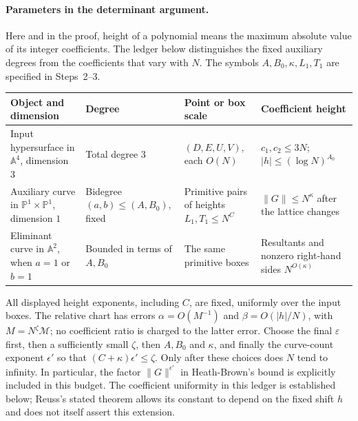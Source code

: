 \paragraph{Parameters in the determinant argument.}
Here and in the proof, height of a polynomial means the maximum absolute
value of its integer coefficients.  The ledger below distinguishes the
fixed auxiliary degrees from the coefficients that vary with $N$.
The symbols $A,B_0,\kappa,L_1,T_1$ are specified in Steps~2--3.
\begin{center}
\small
\begin{tabularx}{\textwidth}{@{}>{\raggedright\arraybackslash}p{}>{\raggedright\arraybackslash}p{}>{\raggedright\arraybackslash}p{}>{\raggedright\arraybackslash}X@{}}
\toprule
Object and dimension & Degree & Point or box scale & Coefficient height\\
\midrule
Input hypersurface in $\mathbb A^4$, dimension $3$
& Total degree $3$
& $(D,E,U,V)$, each $O(N)$
& $c_1,c_2\leq3N$; $|h|\leq(\log N)^{A_0}$\\
Auxiliary curve in $\mathbb P^1\!\times\!\mathbb P^1$, dimension $1$
& Bidegree $(a,b)\leq(A,B_0)$, fixed
& Primitive pairs of heights $L_1,T_1\leq N^C$
& $\|G\|\leq N^\kappa$ after the lattice changes\\
Eliminant curve in $\mathbb A^2$, when $a=1$ or $b=1$
& Bounded in terms of $A,B_0$
& The same primitive boxes
& Resultants and nonzero right-hand sides $N^{O(\kappa)}$\\
\bottomrule
\end{tabularx}
\end{center}
All displayed height exponents, including $C$, are fixed, uniformly over
the input boxes.
The relative chart has errors $\alpha=O(M^{-1})$ and
$\beta=O(|h|/N)$, with $M=N^\zeta\mathcal M$; no coefficient ratio
is charged to the latter error.  Choose the final $\varepsilon$ first,
then a sufficiently small $\zeta$, then $A,B_0$ and $\kappa$, and finally
the curve-count exponent $\epsilon'$ so that
$(C+\kappa)\epsilon'\leq\zeta$.  Only after these choices does $N$
tend to infinity.  In particular, the factor $\|G\|^{\epsilon'}$
in Heath-Brown's bound is explicitly included in this budget.
The coefficient uniformity in this ledger is established below;
Reuss's stated theorem allows its constant to depend on the fixed shift
$h$ and does not itself assert this extension.

